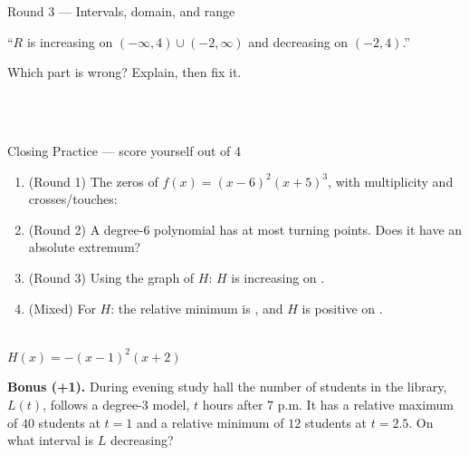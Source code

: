 \begin{notesbox}{Round 3 --- Intervals, domain, and range}
\begin{minipage}[t]{0.62\linewidth}
\vspace{3pt}
\hspace*{1em}``$R$ is increasing on $(-\infty,4)\cup(-2,\infty)$ and decreasing on $(-2,4)$.''

\vspace{3pt}
Which part is wrong? Explain, then fix it.
\end{minipage}\hfill
\begin{minipage}[t]{0.34\linewidth}
\vspace{0pt}\centering
\gR[0.32]
\end{minipage}
\par
{}\\
\\
\end{notesbox}

\boxguard[24]
\begin{notesbox}{Closing Practice --- score yourself out of 4}
\small
\begin{minipage}[t]{0.64\linewidth}
\vspace{0pt}
\begin{enumerate}[leftmargin=1.5em, itemsep=8pt]
  \item (Round 1) The zeros of $f(x)=(x-6)^2(x+5)^3$, with multiplicity and crosses/touches:

  \item (Round 2) A degree-6 polynomial has at most  turning points. Does it have
        an absolute extremum? 
  \item (Round 3) Using the graph of $H$: $H$ is increasing on .
  \item (Mixed) For $H$: the relative minimum is , and $H$ is positive on
        .
\end{enumerate}
\end{minipage}\hfill
\begin{minipage}[t]{0.32\linewidth}
\vspace{0pt}\centering
\gH[0.40]\\[1pt]
{\scriptsize $H(x)=-(x-1)^2(x+2)$}
\end{minipage}

\vspace{8pt}
\textbf{Bonus (+1).} During evening study hall the number of students in the library, $L(t)$,
follows a degree-3 model, $t$ hours after 7 p.m. It has a relative maximum of $40$ students at
$t=1$ and a relative minimum of $12$ students at $t=2.5$. On what interval is $L$ decreasing?
\end{notesbox}


